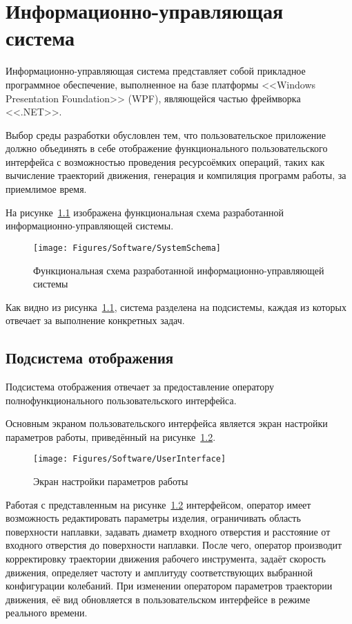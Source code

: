 \chapter{Информационно-управляющая система}
Информационно-управляющая система представляет собой прикладное программное обеспечение, выполненное на базе платформы <<Windows Presentation Foundation>> (WPF), являющейся частью фреймворка <<.NET>>.

Выбор среды разработки обусловлен тем, что пользовательское приложение должно объединять в себе отображение функционального пользовательского интерфейса с возможностью проведения ресурсоёмких операций, таких как вычисление траекторий движения, генерация и компиляция программ работы, за приемлимое время.

На рисунке~\ref{fig:SystemSchema} изображена функциональная схема разработанной информационно-управляющей системы.

\begin{figure}[H]
    \centering
    \vspace{14pt}
    \texttt{[image: Figures/Software/SystemSchema]}
    \caption{Функциональная схема разработанной информационно-управляющей системы}
    \label{fig:SystemSchema}
\end{figure}

Как видно из рисунка~\ref{fig:SystemSchema}, система разделена на подсистемы, каждая из которых отвечает за выполнение конкретных задач.


\section{Подсистема отображения}
Подсистема отображения отвечает за предоставление оператору полнофункционального пользовательского интерфейса.

Основным экраном пользовательского интерфейса является экран настройки параметров работы, приведённый на рисунке~\ref{fig:UserInterface}.

\begin{figure}[H]
    \centering
    \vspace{14pt}
    \texttt{[image: Figures/Software/UserInterface]}
    \caption{Экран настройки параметров работы}
    \label{fig:UserInterface}
\end{figure}

Работая с представленным на рисунке~\ref{fig:UserInterface} интерфейсом, оператор имеет возможность редактировать параметры изделия, ограничивать область поверхности наплавки, задавать диаметр входного отверстия и расстояние от входного отверстия до поверхности наплавки.
После чего, оператор производит корректировку траектории движения рабочего инструмента, задаёт скорость движения, определяет частоту и амплитуду соответствующих выбранной конфигурации колебаний.
При изменении оператором параметров траектории движения, её вид обновляется в пользовательском интерфейсе в режиме реального времени.

